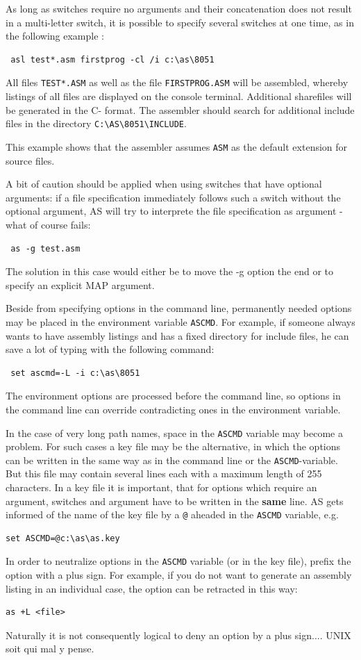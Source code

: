 \documentclass[12pt,twoside]{report}
\newcommand{\bb}[1]{{\bf #1}}
\newcommand{\tty}[1]{{\tt #1}}
\newcommand{\asname}{{AS}}
\begin{document}
As long as switches require no arguments and their concatenation does
not result in a multi-letter switch, it is possible to specify several
switches at one time, as in the following example :
\begin{verbatim}
 asl test*.asm firstprog -cl /i c:\as\8051
\end{verbatim}
All files \tty{TEST*.ASM} as well as the file \tty{FIRSTPROG.ASM} will be
assembled, whereby listings of all files are displayed on the
console terminal.  Additional sharefiles will be generated in the C-
format.  The assembler should search for additional include files
in the directory \verb!C:\AS\8051\INCLUDE!.

This example shows that the assembler assumes \tty{ASM} as the default
extension for source files.

A bit of caution should be applied when using switches that have
optional arguments: if a file specification immediately follows such
a switch without the optional argument, \asname{} will try to interprete the
file specification as argument - what of course fails:
\begin{verbatim}
 as -g test.asm
\end{verbatim}
The solution in this case would either be to move the -g option the
end or to specify an explicit MAP argument.


Beside from specifying options in the command line, permanently
needed options may be placed in the environment variable \tty{ASCMD}.  For
example, if someone always wants to have assembly listings and has a
fixed directory for include files, he can save a lot of typing with
the following command:
\begin{verbatim}
 set ascmd=-L -i c:\as\8051
\end{verbatim}
The environment options are processed before the command line,
so options in the command line can override contradicting ones in the
environment variable.

In the case of very long path names, space in the \tty{ASCMD} variable may
become a problem.  For such cases a key file may be the alternative,
in which the options can be written in the same way as in the command
line or the \tty{ASCMD}-variable.  But this file may contain several lines
each with a maximum length of 255 characters.  In a key file it is
important, that for options which require an argument, switches and
argument have to be written in the \bb{same} line.  \asname{} gets informed of
the name of the key file by a \tty{@} aheaded in the \tty{ASCMD} variable,
e.g.
\begin{verbatim}
set ASCMD=@c:\as\as.key
\end{verbatim}
In order to neutralize options in the \tty{ASCMD} variable (or in the
key file), prefix the option with a plus sign.  For example, if you
do not want to generate an assembly listing in an individual case,
the option can be retracted in this way:
\begin{verbatim}
as +L <file>
\end{verbatim}
Naturally it is not consequently logical to deny an option by a
plus sign....  UNIX soit qui mal y pense.
\end{document}
